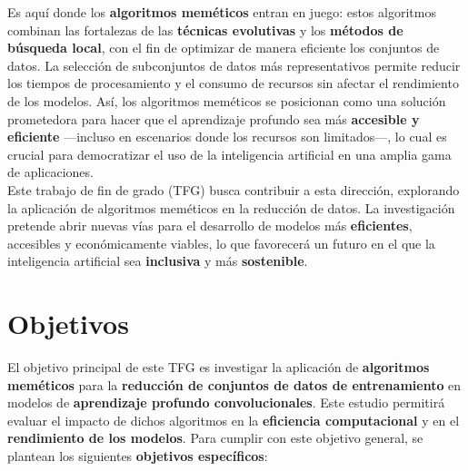 Es aquí donde los \textbf{algoritmos meméticos} entran en juego: estos algoritmos combinan las fortalezas de las
\textbf{técnicas evolutivas} y los \textbf{métodos de búsqueda local}, con el fin de optimizar de manera eficiente los
conjuntos de datos.
La selección de subconjuntos de datos más representativos permite reducir los tiempos de procesamiento y el consumo de
recursos sin afectar el rendimiento de los modelos.
Así, los algoritmos meméticos se posicionan como una solución prometedora para hacer que el aprendizaje profundo sea
más \textbf{accesible y eficiente} —incluso en escenarios donde los recursos son limitados—, lo cual es crucial para
democratizar el uso de la inteligencia artificial en una amplia gama de aplicaciones. \\[6pt]

Este trabajo de fin de grado (TFG) busca contribuir a esta dirección, explorando la aplicación de algoritmos meméticos
en la reducción de datos.
La investigación pretende abrir nuevas vías para el desarrollo de modelos más \textbf{eficientes}, accesibles y
económicamente viables, lo que favorecerá un futuro en el que la inteligencia artificial sea \textbf{inclusiva} y más
\textbf{sostenible}. \\[6pt]

\section{Objetivos}\label{sec:objetivos}
El objetivo principal de este TFG es investigar la aplicación de \textbf{algoritmos meméticos} para la
\textbf{reducción de conjuntos de datos de entrenamiento} en modelos de \textbf{aprendizaje profundo convolucionales}.
Este estudio permitirá evaluar el impacto de dichos algoritmos en la \textbf{eficiencia computacional} y en el
\textbf{rendimiento de los modelos}.
Para cumplir con este objetivo general, se plantean los siguientes \textbf{objetivos específicos}:

